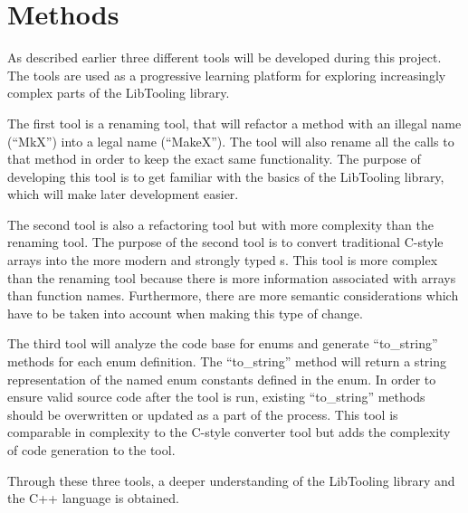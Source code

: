 \chapter{Methods}

As described earlier three different tools will be developed during this project. The tools are used as a progressive learning platform for exploring increasingly complex parts of the LibTooling library. 

The first tool is a renaming tool, that will refactor a method with an illegal name (``MkX'') into a legal name (``MakeX''). The tool will also rename all the calls to that method in order to keep the exact same functionality. The purpose of developing this tool is to get familiar with the basics of the LibTooling library, which will make later development easier. 

The second tool is also a refactoring tool but with more complexity than the renaming tool. The purpose of the second tool is to convert traditional C-style arrays into the more modern and strongly typed s. This tool is more complex than the renaming tool because there is more information associated with arrays than function names. Furthermore, there are more semantic considerations which have to be taken into account when making this type of change. 

The third tool will analyze the code base for enums and generate ``to\_string'' methods for each enum definition. The ``to\_string'' method will return a string representation of the named enum constants defined in the enum. In order to ensure valid source code after the tool is run, existing ``to\_string'' methods should be overwritten or updated as a part of the process. 
This tool is comparable in complexity to the C-style converter tool but adds the complexity of code generation to the tool. 

Through these three tools, a deeper understanding of the LibTooling library and the C++ language is obtained.